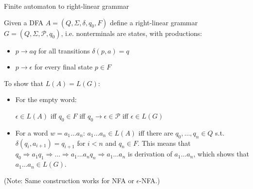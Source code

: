 \documentclass[handout]{beamer}
\begin{document}
\begin{frame}{Finite automaton to right-linear grammar}

	Given a DFA $A=(Q,\Sigma, \delta,q_0,F)$ define a right-linear grammar $G=(Q,\Sigma, \mathcal P, q_0)$, i.e. nonterminals are states, with productions:
	
	\begin{itemize}
		\item $p\rightarrow aq$ for all transitions $\delta(p,a)=q$
		\item $p\rightarrow \epsilon$ for every final state $p\in F$
	\end{itemize}
	
	To show that $L(A)=L(G)$:
	
	\begin{itemize}
		\item For the empty word:
		
		\bigskip
		$\epsilon\in L(A)$ iff $q_0\in F$ iff $q_0\rightarrow \epsilon\in\mathcal P$ iff $\epsilon\in L(G)$
		\bigskip
		
		\item For a word $w=a_1\dots a_n$:
		$a_1\dots a_n\in L(A)$ iff there are $q_0,\dots, q_n\in Q$ s.t. $\delta(q_i,a_{i+1})=q_{i+1}$ for $i<n$ and $q_n\in F$.
		This means that $q_0\Rightarrow a_1q_1\Rightarrow\dots\Rightarrow a_1\dots a_n q_n\Rightarrow a_1\dots a_n$ is derivation of $a_1\dots a_n$, which shows that $a_1\dots a_n\in L(G)$.\hfill\qedsymbol

	\end{itemize}
	(Note: Same construction works for NFA or $\epsilon$-NFA.)

\end{frame}
\end{document}
